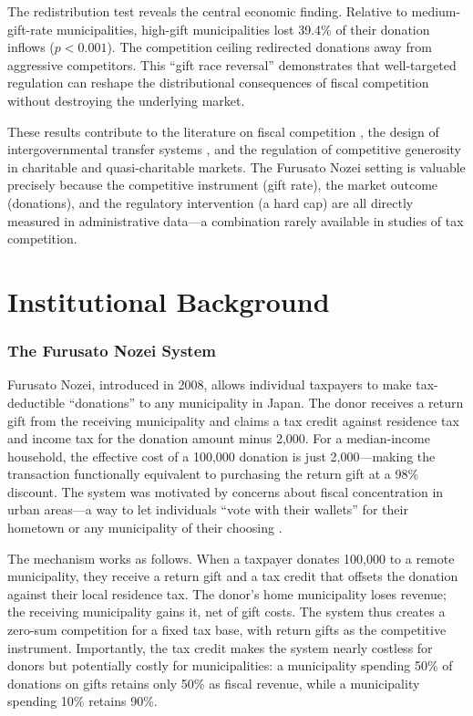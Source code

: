 \documentclass[12pt]{article}
\newcommand{\textyen}{\text{\yen}}
\begin{document}
The redistribution test reveals the central economic finding. Relative to medium-gift-rate municipalities, high-gift municipalities lost 39.4\% of their donation inflows ($p < 0.001$). The competition ceiling redirected donations away from aggressive competitors. This ``gift race reversal'' demonstrates that well-targeted regulation can reshape the distributional consequences of fiscal competition without destroying the underlying market.

These results contribute to the literature on fiscal competition \citep{wilson1999theories, keen1998tax}, the design of intergovernmental transfer systems \citep{smart1998taxation}, and the regulation of competitive generosity in charitable and quasi-charitable markets. The Furusato Nozei setting is valuable precisely because the competitive instrument (gift rate), the market outcome (donations), and the regulatory intervention (a hard cap) are all directly measured in administrative data---a combination rarely available in studies of tax competition.

\section{Institutional Background}

\subsubsection*{The Furusato Nozei System} Furusato Nozei, introduced in 2008, allows individual taxpayers to make tax-deductible ``donations'' to any municipality in Japan. The donor receives a return gift from the receiving municipality and claims a tax credit against residence tax and income tax for the donation amount minus \textyen 2,000. For a median-income household, the effective cost of a \textyen 100,000 donation is just \textyen 2,000---making the transaction functionally equivalent to purchasing the return gift at a 98\% discount. The system was motivated by concerns about fiscal concentration in urban areas---a way to let individuals ``vote with their wallets'' for their hometown or any municipality of their choosing \citep{fukasawa2020strategic}.

The mechanism works as follows. When a taxpayer donates \textyen 100,000 to a remote municipality, they receive a return gift and a tax credit that offsets the donation against their local residence tax. The donor's home municipality loses revenue; the receiving municipality gains it, net of gift costs. The system thus creates a zero-sum competition for a fixed tax base, with return gifts as the competitive instrument. Importantly, the tax credit makes the system nearly costless for donors but potentially costly for municipalities: a municipality spending 50\% of donations on gifts retains only 50\% as fiscal revenue, while a municipality spending 10\% retains 90\%.
\end{document}
